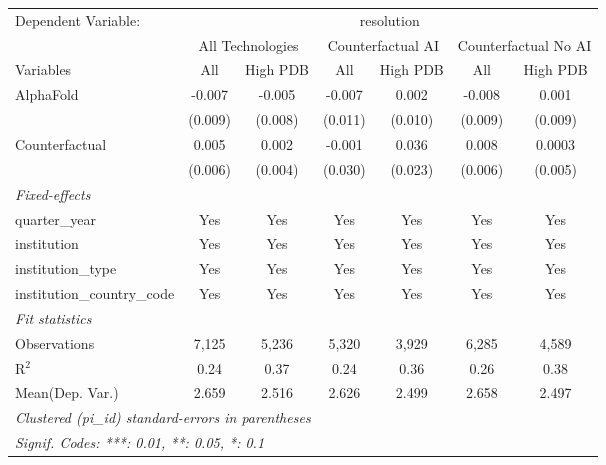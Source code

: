 \begingroup
\centering
\begin{tabular}{lcccccc}
   \tabularnewline \midrule \midrule
   Dependent Variable: & \multicolumn{6}{c}{resolution}\\
 & \multicolumn{2}{c}{All Technologies} & \multicolumn{2}{c}{Counterfactual AI} & \multicolumn{2}{c}{Counterfactual No AI} \\
\cmidrule(lr){1-1}\cmidrule(lr){2-3} \cmidrule(lr){4-5} \cmidrule(lr){6-7}
Variables & \multicolumn{1}{c}{All} & \multicolumn{1}{c}{High PDB} & \multicolumn{1}{c}{All} & \multicolumn{1}{c}{High PDB} & \multicolumn{1}{c}{All} & \multicolumn{1}{c}{High PDB} \\
\cmidrule(lr){1-1}\cmidrule(lr){2-2} \cmidrule(lr){3-3} \cmidrule(lr){4-4} \cmidrule(lr){5-5} \cmidrule(lr){6-6} \cmidrule(lr){7-7}
   AlphaFold                    & -0.007  & -0.005  & -0.007  & 0.002   & -0.008  & 0.001\\   
                                & (0.009) & (0.008) & (0.011) & (0.010) & (0.009) & (0.009)\\   
   Counterfactual               & 0.005   & 0.002   & -0.001  & 0.036   & 0.008   & 0.0003\\   
                                & (0.006) & (0.004) & (0.030) & (0.023) & (0.006) & (0.005)\\   
   \midrule
   \emph{Fixed-effects}\\
   quarter\_year                & Yes     & Yes     & Yes     & Yes     & Yes     & Yes\\  
   institution                  & Yes     & Yes     & Yes     & Yes     & Yes     & Yes\\  
   institution\_type            & Yes     & Yes     & Yes     & Yes     & Yes     & Yes\\  
   institution\_country\_code   & Yes     & Yes     & Yes     & Yes     & Yes     & Yes\\  
   \midrule
   \emph{Fit statistics}\\
   Observations                 & 7,125   & 5,236   & 5,320   & 3,929   & 6,285   & 4,589\\  
   R$^2$                        & 0.24    & 0.37    & 0.24    & 0.36    & 0.26    & 0.38\\  
Mean(Dep. Var.) & 2.659 & 2.516 & 2.626 & 2.499 & 2.658 & 2.497 \\
   \midrule \midrule
   \multicolumn{7}{l}{\emph{Clustered (pi\_id) standard-errors in parentheses}}\\
   \multicolumn{7}{l}{\emph{Signif. Codes: ***: 0.01, **: 0.05, *: 0.1}}\\
\end{tabular}
\par\endgroup
